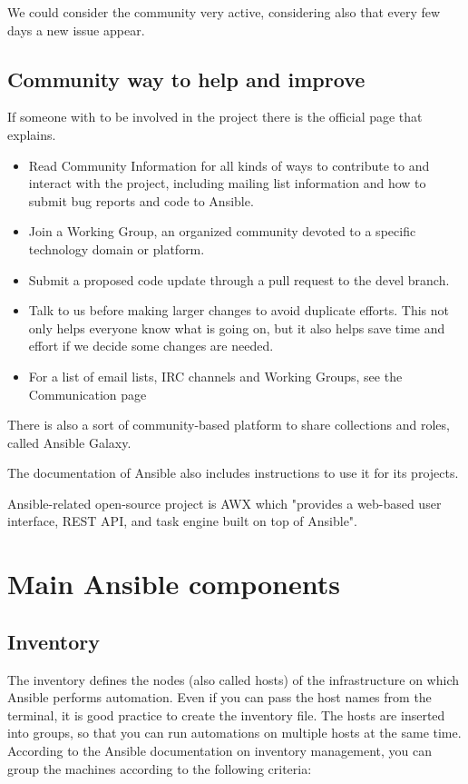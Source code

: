 \documentclass[12pt,a4paper,openright,twoside]{book}
\begin{document}
We could consider the community very active, considering also that every few days a new issue appear.

\subsection{Community way to help and improve}
If someone with to be involved in the project there is the official page that explains\cite {ansibleGithub}.

\begin{itemize}
    \item Read Community Information for all kinds of ways to contribute to and interact with the project, including mailing list information and how to submit bug reports and code to Ansible.
    \item Join a Working Group, an organized community devoted to a specific technology domain or platform.
    \item Submit a proposed code update through a pull request to the devel branch.
    \item Talk to us before making larger changes to avoid duplicate efforts. This not only helps everyone know what is going on, but it also helps save time and effort if we decide some changes are needed.
    \item For a list of email lists, IRC channels and Working Groups, see the Communication page
\end{itemize}

There is also a sort of community-based platform to share collections and roles, called Ansible Galaxy\cite{ansibleGalaxy}.



The documentation of Ansible also includes instructions to use it for its projects.

Ansible-related open-source project is AWX which "provides a web-based user interface, REST API, and task engine built on top of Ansible"\cite{ansibleAWX}.

\section{Main Ansible components}

\subsection{Inventory}
            The inventory defines the nodes (also called hosts) of the infrastructure on which Ansible performs automation.
            Even if you can pass the host names from the terminal, it is good practice to create the inventory file.
            The hosts are inserted into groups, so that you can run automations on multiple hosts at the same time.
            According to the Ansible documentation on inventory management\cite{ansibleDocInventory}, you can group the machines according to the following criteria:
            
\end{document}

